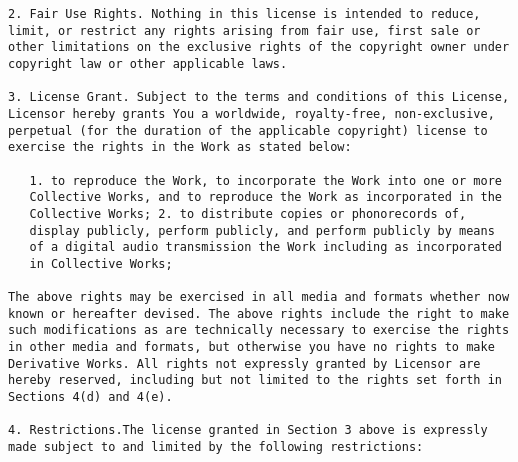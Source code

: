 \begin{lstlisting}[firstnumber=1,]
2. Fair Use Rights. Nothing in this license is intended to reduce,
limit, or restrict any rights arising from fair use, first sale or
other limitations on the exclusive rights of the copyright owner under
copyright law or other applicable laws.

3. License Grant. Subject to the terms and conditions of this License,
Licensor hereby grants You a worldwide, royalty-free, non-exclusive,
perpetual (for the duration of the applicable copyright) license to
exercise the rights in the Work as stated below:

   1. to reproduce the Work, to incorporate the Work into one or more
   Collective Works, and to reproduce the Work as incorporated in the
   Collective Works; 2. to distribute copies or phonorecords of,
   display publicly, perform publicly, and perform publicly by means
   of a digital audio transmission the Work including as incorporated
   in Collective Works;

The above rights may be exercised in all media and formats whether now
known or hereafter devised. The above rights include the right to make
such modifications as are technically necessary to exercise the rights
in other media and formats, but otherwise you have no rights to make
Derivative Works. All rights not expressly granted by Licensor are
hereby reserved, including but not limited to the rights set forth in
Sections 4(d) and 4(e).

4. Restrictions.The license granted in Section 3 above is expressly
made subject to and limited by the following restrictions:


\end{lstlisting}
